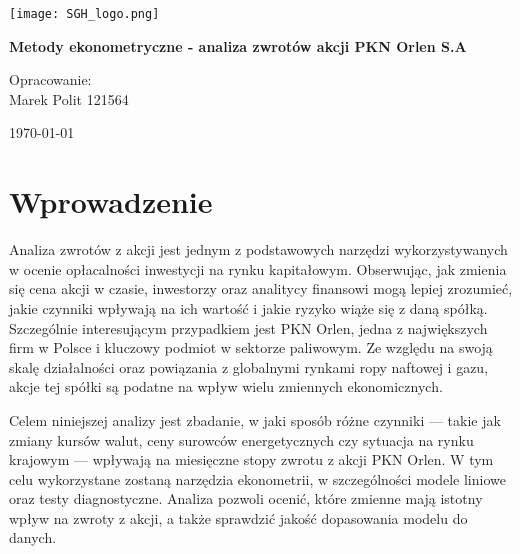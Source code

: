 \documentclass[12pt, twoside]{article}
\begin{document}
\begin{titlepage}
  \thispagestyle{empty}  

  \centering

  \texttt{[image: SGH\_logo.png]}\par
  \vspace{1cm}


  {\Huge\bfseries Metody ekonometryczne - analiza zwrotów akcji PKN Orlen S.A 
\par}




  
  \vspace{2cm}
\begin{flushright}
{\large Opracowanie: 
\\
Marek Polit 121564\\[3pt]
}
\end{flushright}



\vfill

  
  
  {\large \today}

\end{titlepage}









\tableofcontents
\newpage

\section{Wprowadzenie}
Analiza zwrotów z akcji jest jednym z podstawowych narzędzi wykorzystywanych w ocenie opłacalności inwestycji na rynku kapitałowym. Obserwując, jak zmienia się cena akcji w czasie, inwestorzy oraz analitycy finansowi mogą lepiej zrozumieć, jakie czynniki wpływają na ich wartość i jakie ryzyko wiąże się z daną spółką. Szczególnie interesującym przypadkiem jest PKN Orlen, jedna z największych firm w Polsce i kluczowy podmiot w sektorze paliwowym. Ze względu na swoją skalę działalności oraz powiązania z globalnymi rynkami ropy naftowej i gazu, akcje tej spółki są podatne na wpływ wielu zmiennych ekonomicznych.

Celem niniejszej analizy jest zbadanie, w jaki sposób różne czynniki — takie jak zmiany kursów walut, ceny surowców energetycznych czy sytuacja na rynku krajowym — wpływają na miesięczne stopy zwrotu z akcji PKN Orlen. W tym celu wykorzystane zostaną narzędzia ekonometrii, w szczególności modele liniowe oraz testy diagnostyczne. Analiza pozwoli ocenić, które zmienne mają istotny wpływ na zwroty z akcji, a także sprawdzić jakość dopasowania modelu do danych.
\end{document}
